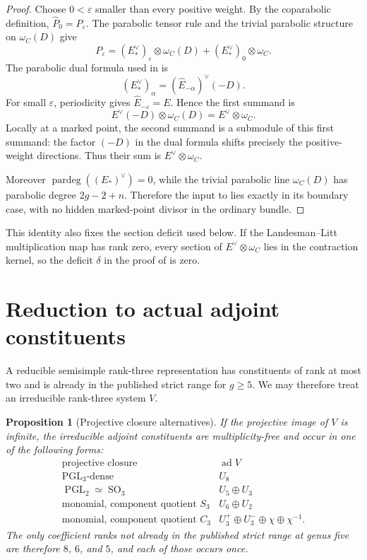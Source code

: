 \documentclass[11pt]{article}
\newtheorem{proposition}[theorem]{Proposition}
\theoremstyle{definition}
\newcommand{\degp}{\operatorname{pardeg}}
\newcommand{\ad}{\operatorname{ad}}
\newcommand{\PGL}{\operatorname{PGL}}
\newcommand{\SO}{\operatorname{SO}}
\begin{document}
\begin{proof}
Choose $0<\varepsilon$ smaller than every positive weight.  By the
coparabolic definition, $\widehat P_0=P_\varepsilon$.  The parabolic tensor
rule and the trivial parabolic structure on $\omega_C(D)$ give
\[
 P_\varepsilon
 = (E_*^\vee)_\varepsilon\otimes\omega_C(D)
   +(E_*^\vee)_0\otimes\omega_C.
\]
The parabolic dual formula used in \cite[Section~2]{LLGeo} is
\[
 (E_*^\vee)_\alpha=(\widehat E_{-\alpha})^\vee(-D).
\]
For small $\varepsilon$, periodicity gives
$\widehat E_{-\varepsilon}=E$.  Hence the first summand is
\[
 E^\vee(-D)\otimes\omega_C(D)=E^\vee\otimes\omega_C.
\]
Locally at a marked point, the second summand is a submodule of this first
summand: the factor $(-D)$ in the dual formula shifts precisely the
positive-weight directions.  Thus their sum is $E^\vee\otimes\omega_C$.

Moreover $\degp((E_*)^\vee)=0$, while the trivial parabolic line
$\omega_C(D)$ has parabolic degree $2g-2+n$.  Therefore the input to
\cite[Proposition~6.3.6]{LLGeo} lies exactly in its boundary case, with no
hidden marked-point divisor in the ordinary bundle.
\end{proof}

This identity also fixes the section deficit used below.  If the
Landesman--Litt multiplication map has rank zero, every section of
$E^\vee\otimes\omega_C$ lies in the contraction kernel, so the deficit
$\delta$ in the proof of \cite[Lemma~6.2.3]{LLGeo} is zero.

\section{Reduction to actual adjoint constituents}\label{sec:closure}

A reducible semisimple rank-three representation has constituents of rank at
most two and is already in the published strict range for $g\ge5$.  We may
therefore treat an irreducible rank-three system $V$.

\begin{proposition}[Projective closure alternatives]\label{prop:closure}
If the projective image of $V$ is infinite, the irreducible adjoint
constituents are multiplicity-free and occur in one of the following forms:
\[
\begin{array}{c|c}
\text{projective closure}&\ad V\\ \hline
\PGL_3\text{-dense}&U_8\\
\PGL_2\simeq\SO_3&U_5\oplus U_3\\
\text{monomial, component quotient }S_3&U_6\oplus U_2\\
\text{monomial, component quotient }C_3&
 U_3^+\oplus U_3^-\oplus\chi\oplus\chi^{-1}.
\end{array}
\]
The only coefficient ranks not already in the published strict range at
genus five are therefore $8$, $6$, and $5$, and each of those occurs once.
\end{proposition}
\end{document}
